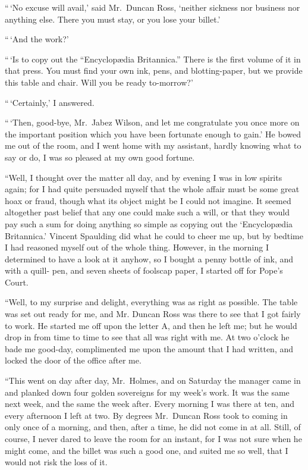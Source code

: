 “\,‘No excuse will avail,’ said Mr.~Duncan Ross, ‘neither
sickness nor business nor anything else. There you must
stay, or you lose your billet.’

“\,‘And the work?’

“\,‘Is to copy out the “Encyclopædia Britannica.” There
is the first volume of it in that press. You must find your
own ink, pens, and blotting-paper, but we provide this table
and chair. Will you be ready to-morrow?’

“\,‘Certainly,’ I answered.

“\,‘Then, good-bye, Mr.~Jabez Wilson, and let me congratulate
you once more on the important position which you
have been fortunate enough to gain.’ He bowed me out of
the room, and I went home with my assistant, hardly knowing
what to say or do, I was so pleased at my own good
fortune.

“Well, I thought over the matter all day, and by evening I
was in low spirits again; for I had quite persuaded myself
that the whole affair must be some great hoax or fraud,
though what its object might be I could not imagine. It
seemed altogether past belief that any one could make such
a will, or that they would pay such a sum for doing anything
so simple as copying out the ‘Encyclopædia Britannica.’
Vincent Spaulding did what he could to cheer me up, but by
bedtime I had reasoned myself out of the whole thing.
However, in the morning I determined to have a look at it
anyhow, so I bought a penny bottle of ink, and with a quill-%
pen, and seven sheets of foolscap paper, I started off for
Pope’s Court.

“Well, to my surprise and delight, everything was as right
as possible. The table was set out ready for me, and Mr.
Duncan Ross was there to see that I got fairly to work. He
started me off upon the letter A, and then he left me; but he
would drop in from time to time to see that all was right with
me. At two o’clock he bade me good-day, complimented me
upon the amount that I had written, and locked the door of
the office after me.

“This went on day after day, Mr.~Holmes, and on Saturday
the manager came in and planked down four golden sovereigns
for my week’s work. It was the same next week, and
the same the week after. Every morning I was there at ten,
and every afternoon I left at two. By degrees Mr.~Duncan
Ross took to coming in only once of a morning, and then, after
a time, he did not come in at all. Still, of course, I never
dared to leave the room for an instant, for I was not sure
when he might come, and the billet was such a good one,
and suited me so well, that I would not risk the loss of it.

